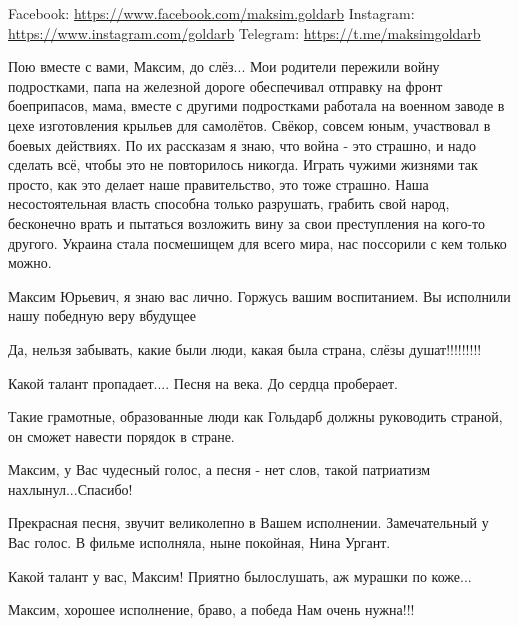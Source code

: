 \begin{itemize}
\begin{multicols}{2}
Facebook: \url{https://www.facebook.com/maksim.goldarb}
Instagram: \url{https://www.instagram.com/goldarb} 
Telegram: \url{https://t.me/maksimgoldarb}


Пою вместе с вами, Максим, до слёз... Мои родители пережили  войну подростками,
папа на железной дороге обеспечивал отправку на фронт боеприпасов, мама, вместе
с другими  подростками работала на военном заводе в цехе изготовления крыльев
для самолётов. Свёкор, совсем юным, участвовал в боевых действиях. По их
рассказам я знаю, что война - это страшно, и надо сделать всё, чтобы это не
повторилось никогда. Играть чужими жизнями так просто, как это делает наше
правительство, это тоже страшно. Наша несостоятельная власть способна только
разрушать, грабить свой народ, бесконечно врать и пытаться возложить вину за
свои преступления на кого-то другого. Украина стала посмешищем для всего мира,
нас поссорили с кем только можно.


Максим Юрьевич, я знаю вас лично. Горжусь вашим воспитанием. Вы исполнили нашу
победную веру вбудущее


Да, нельзя забывать, какие были люди, какая была страна, слёзы душат!!!!!!!!!


Какой талант пропадает.... Песня на века. До сердца проберает.


Такие грамотные, образованные люди как Гольдарб должны руководить страной, он сможет навести порядок в стране.


Максим, у Вас чудесный голос, а песня  - нет слов, такой патриатизм нахлынул...Спасибо!


Прекрасная песня, звучит великолепно в Вашем исполнении. Замечательный у Вас
голос. В фильме исполняла, ныне покойная, Нина Ургант.


Какой талант у вас, Максим! Приятно былослушать, аж мурашки по коже...


Максим, хорошее исполнение, браво, а победа Нам очень нужна!!!



\end{multicols}
\end{itemize}
